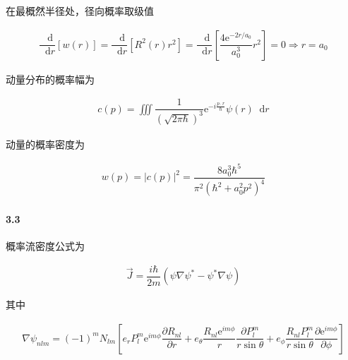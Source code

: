 \documentclass{article}
\newcommand*{\md}{\mathop{}\!\mathrm{d}}
\newcommand*{\me}{\mathrm{e}}
\newcommand*{\Jmath}{J}
\begin{document}
在最概然半径处，径向概率取级值

\begin{equation*}
  \begin{aligned}
    \dfrac{\md}{\md r} \left[ w \left( r \right) \right] =
    \dfrac{\md }{\md r} \left[ R^2 \left( r \right) r^2 \right] = \dfrac{\md}{\md r} \left[ \dfrac{4\me^{-2r/a_0}}{a_0^3} r^2 \right] = 0
    \Rightarrow
    r = a_0
  \end{aligned}
\end{equation*}

动量分布的概率幅为

\begin{equation*}
  \begin{aligned}
    c \left( p \right) = \iiint \dfrac{1}{\left( \sqrt{2\pi \hbar} \right)^3} \me^{- i \frac{p \cdot r}{\hbar} } \psi \left( r \right) \md r 
  \end{aligned}
\end{equation*}

动量的概率密度为

\begin{equation*}
  \begin{aligned}
    w \left( p \right) = \left| c \left( p \right) \right|^2 = \dfrac{8 a_0^3 \hbar^5}{\pi^2 \left( \hbar^2 + a_0^2 p^2 \right)^4} 
  \end{aligned}
\end{equation*}

\paragraph{3.3}

概率流密度公式为

\begin{equation*}
  \begin{aligned}
    \vec{\Jmath} = \dfrac{i \hbar}{2m} \left( \psi \nabla \psi^{*} - \psi^{*} \nabla \psi \right) 
  \end{aligned}
\end{equation*}

其中

\begin{equation*}
  \begin{aligned}
    \nabla \psi_{nlm} = \left( -1 \right)^m N_{lm} \left[ e_r P_l^m \me^{im\phi} \dfrac{\partial R_{nl}}{\partial r} + e_{\theta} \dfrac{R_{nl} \me^{im\phi}}{r} \dfrac{\partial P_l^m}{r \sin \theta} + e_{\phi} \dfrac{R_{nl} P_l^m}{r \sin \theta}  \dfrac{\partial \me^{im\phi}}{\partial \phi}     \right]
  \end{aligned}
\end{equation*}
\end{document}

